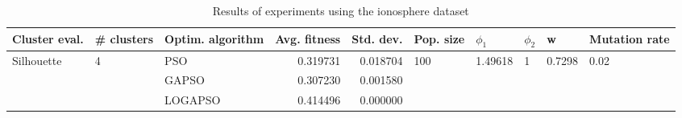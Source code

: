 \begin{table}
\centering
\caption{Results of experiments using the ionosphere dataset}
\begin{tabular}{lllrrlllll}
\toprule
              Cluster eval. &        \# clusters & Optim. algorithm &  Avg. fitness &  Std. dev. &            Pop. size &               $\phi_{1}$ &         $\phi_{2}$ &                       w &         Mutation rate \\
\midrule
\multirow{3}{*}{Silhouette} & \multirow{3}{*}{4} &              PSO &      0.319731 &   0.018704 & \multirow{3}{*}{100} & \multirow{3}{*}{1.49618} & \multirow{3}{*}{1} & \multirow{3}{*}{0.7298} & \multirow{3}{*}{0.02} \\
                            &                    &            GAPSO &      0.307230 &   0.001580 &                      &                          &                    &                         &                       \\
                            &                    &          LOGAPSO &      0.414496 &   0.000000 &                      &                          &                    &                         &                       \\
\bottomrule
\end{tabular}
\end{table}
